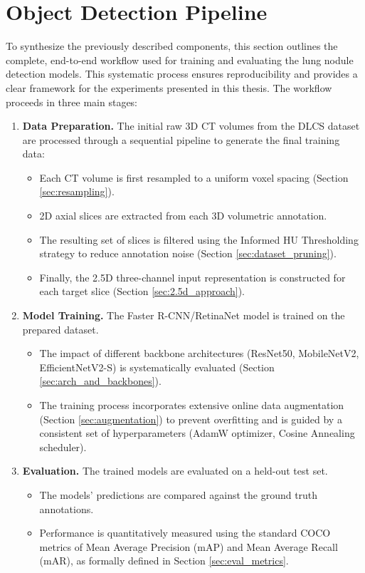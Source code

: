 \section{Object Detection Pipeline}
To synthesize the previously described components, this section outlines the complete, end-to-end workflow used for training and evaluating the lung nodule detection models. This systematic process ensures reproducibility and provides a clear framework for the experiments presented in this thesis. The workflow proceeds in three main stages:

\begin{enumerate}
    \item \textbf{Data Preparation.} The initial raw 3D CT volumes from the DLCS dataset are processed through a sequential pipeline to generate the final training data:
    \begin{itemize}
        \item Each CT volume is first resampled to a uniform voxel spacing (Section \ref{sec:resampling}).
        \item 2D axial slices are extracted from each 3D volumetric annotation.
        \item The resulting set of slices is filtered using the Informed HU Thresholding strategy to reduce annotation noise (Section \ref{sec:dataset_pruning}).
        \item Finally, the 2.5D three-channel input representation is constructed for each target slice (Section \ref{sec:2.5d_approach}).
    \end{itemize}

    \item \textbf{Model Training.} The Faster R-CNN/RetinaNet model is trained on the prepared dataset. 
    \begin{itemize}
        \item The impact of different backbone architectures (ResNet50, MobileNetV2, EfficientNetV2-S) is systematically evaluated (Section \ref{sec:arch_and_backbones}).
        \item The training process incorporates extensive online data augmentation (Section \ref{sec:augmentation}) to prevent overfitting and is guided by a consistent set of hyperparameters (AdamW optimizer, Cosine Annealing scheduler).
    \end{itemize}

    \item \textbf{Evaluation.} The trained models are evaluated on a held-out test set. 
    \begin{itemize}
        \item The models' predictions are compared against the ground truth annotations.
        \item Performance is quantitatively measured using the standard COCO metrics of Mean Average Precision (mAP) and Mean Average Recall (mAR), as formally defined in Section \ref{sec:eval_metrics}.
    \end{itemize}
\end{enumerate}





